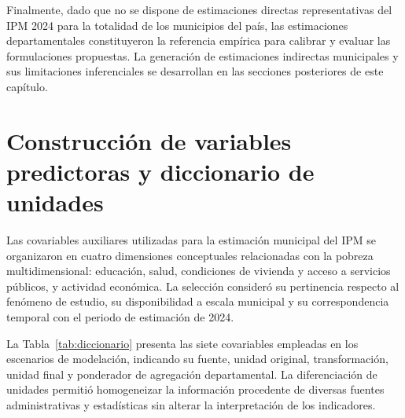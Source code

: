 Finalmente, dado que no se dispone de estimaciones directas representativas del IPM 2024 para la totalidad de los municipios del país, las estimaciones departamentales constituyeron la referencia empírica para calibrar y evaluar las formulaciones propuestas. La generación de estimaciones indirectas municipales y sus limitaciones inferenciales se desarrollan en las secciones posteriores de este capítulo.



\section{Construcción de variables predictoras y diccionario de unidades}
\label{sec:met-predictoras}

Las covariables auxiliares utilizadas para la estimación municipal del IPM se organizaron en cuatro dimensiones conceptuales relacionadas con la pobreza multidimensional: educación, salud, condiciones de vivienda y acceso a servicios públicos, y actividad económica. La selección consideró su pertinencia respecto al fenómeno de estudio, su disponibilidad a escala municipal y su correspondencia temporal con el periodo de estimación de 2024.

La Tabla~\ref{tab:diccionario} presenta las siete covariables empleadas en los escenarios de modelación, indicando su fuente, unidad original, transformación, unidad final y ponderador de agregación departamental. La diferenciación de unidades permitió homogeneizar la información procedente de diversas fuentes administrativas y estadísticas sin alterar la interpretación de los indicadores.

